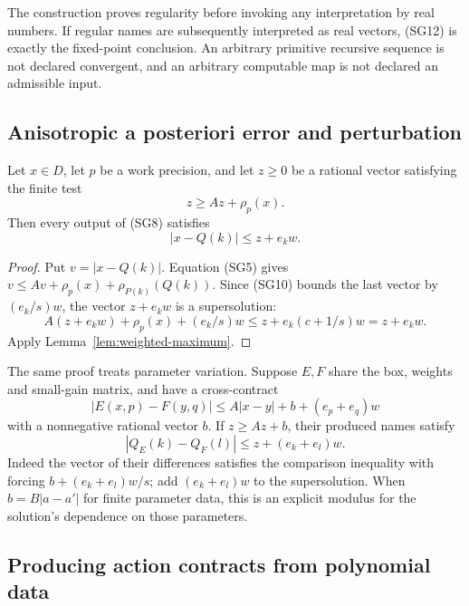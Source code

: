 The construction proves regularity before invoking any interpretation by
real numbers.  If regular names are subsequently interpreted as real
vectors, (SG12) is exactly the fixed-point conclusion.  An arbitrary
primitive recursive sequence is not declared convergent, and an arbitrary
computable map is not declared an admissible input.

\subsection{Anisotropic a posteriori error and perturbation}

\begin{theorem}
\label{thm:anisotropic-residual}
Let $x\in D$, let $p$ be a work precision, and let $z\ge0$ be a rational
vector satisfying the finite test
\begin{equation}
 z\ge Az+\rho_p(x).                             \tag{SG14}
\end{equation}
Then every output of (SG8) satisfies
\begin{equation}
 |x-Q(k)|\le z+e_kw.                            \tag{SG15}
\end{equation}
\end{theorem}
\begin{proof}
Put $v=|x-Q(k)|$.  Equation (SG5) gives
$v\le Av+\rho_p(x)+\rho_{P(k)}(Q(k))$.
Since (SG10) bounds the last vector by $(e_k/s)w$, the vector
$z+e_kw$ is a supersolution:
\[
 A(z+e_kw)+\rho_p(x)+(e_k/s)w
 \le z+e_k(c+1/s)w=z+e_kw.
\]
Apply Lemma~\ref{lem:weighted-maximum}.
\end{proof}

The same proof treats parameter variation.  Suppose $E,F$ share the box,
weights and small-gain matrix, and have a cross-contract
\[
 |E(x,p)-F(y,q)|\le A|x-y|+b+(e_p+e_q)w
\]
with a nonnegative rational vector $b$.  If $z\ge Az+b$, their produced
names satisfy
\begin{equation}
 |Q_E(k)-Q_F(l)|\le z+(e_k+e_l)w.               \tag{SG16}
\end{equation}
Indeed the vector of their differences satisfies the comparison inequality
with forcing $b+(e_k+e_l)w/s$; add $(e_k+e_l)w$ to the supersolution.
When $b=B|a-a'|$ for finite parameter data, this is an explicit modulus
for the solution's dependence on those parameters.

\subsection{Producing action contracts from polynomial data}

